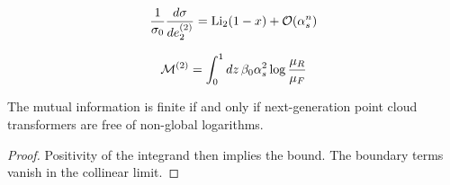\begin{equation}
  \frac{1}{\sigma_0} \frac{d\sigma}{de_2^{(2)}} = \mathrm{Li}_{2}(1 - x) + \mathcal{O}(\alpha_s^{n})
  \label{eq:2}
\end{equation}

\begin{equation}
  \mathcal{M}^{(2)} = \int_0^1 dz \, \beta_0 \alpha_s^2 \log\frac{\mu_R}{\mu_F}
  \label{eq:4}
\end{equation}

\begin{lemma}\label{thm:2}
The mutual information is finite if and only if next-generation point
cloud transformers are free of non-global logarithms.
\end{lemma}

\begin{proof}
Positivity of the integrand then implies the bound. The boundary terms
vanish in the collinear limit.
\end{proof}

